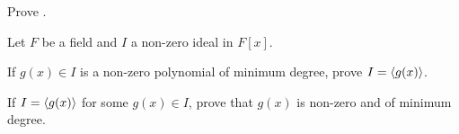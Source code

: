 \begin{problem}\label{problem-remainder-theorem}
    Prove .
\end{problem}

\begin{problem}\label{problem-criterion-for-principal-ideal-in-polynomial-field}
    Let $F$ be a field and $I$ a non-zero ideal in $F[x]$.
    \begin{partquestions}{\roman*}
        \item If $g(x) \in I$ is a non-zero polynomial of minimum degree, prove $I = \left\langle g(x)\right\rangle$.
        \item If $I = \left\langle g(x)\right\rangle$ for some $g(x) \in I$, prove that $g(x)$ is non-zero and of minimum degree.
    \end{partquestions}
\end{problem}

